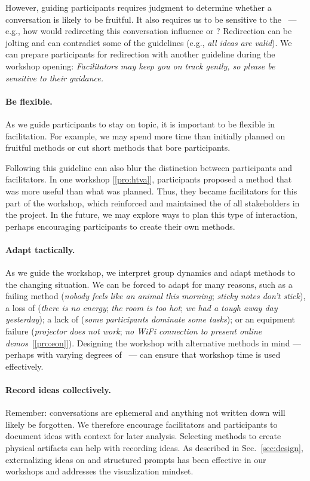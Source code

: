 However, guiding participants requires judgment to determine whether a conversation is likely to be fruitful. It also requires us to be sensitive to the \tactics~--- e.g., how would redirecting this conversation influence \collegiality or \agency? Redirection can be jolting and can contradict some of the guidelines (e.g., \emph{all ideas are valid}). We can prepare participants for redirection with another guideline during the workshop opening: \emph{Facilitators may keep you on track gently, so please be sensitive to their guidance.} 

\paragraph{Be flexible.} As we guide participants to stay on topic, it is important to be flexible in facilitation. For example, we may spend more time than initially planned on fruitful methods or cut short methods that bore participants. 

Following this guideline can also blur the distinction between participants and facilitators. In one workshop [\ref{pro:htva}], participants proposed a method that was more useful than what was planned. Thus, they became facilitators for this part of the workshop, which reinforced \agency and maintained the \interest of all stakeholders in the project. In the future, we may explore ways to plan this type of interaction, perhaps encouraging participants to create their own methods. 

\paragraph{Adapt tactically.} As we guide the workshop, we interpret group dynamics and adapt methods to the changing situation. We can be forced to adapt for many reasons, such as a failing method (\emph{nobody feels like an animal this morning}; \emph{sticky notes don't stick}), a loss of \interest (\emph{there is no energy}; \emph{the room is too hot}; \emph{we had a tough away day yesterday}); a lack of \agency (\emph{some participants dominate some tasks}); or an equipment failure ({\it projector does not work}; {\it no WiFi connection to present online demos}~[\ref{pro:eon}]). Designing the workshop with alternative methods in mind --- perhaps with varying degrees of \challenge~--- can ensure that workshop time is used effectively.

\paragraph{Record ideas collectively.} Remember: conversations are ephemeral and anything not written down will likely be forgotten. We therefore encourage facilitators and participants to document ideas with context for later analysis. Selecting methods to create physical artifacts can help with recording ideas. As described in Sec.~\ref{sec:design}, externalizing ideas on \stickyNotes and structured prompts has been effective in our workshops and addresses the visualization mindset. 

